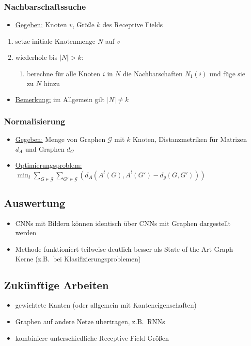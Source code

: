 \subsubsection{Nachbarschaftssuche}

\begin{itemize}
  \item \underline{Gegeben:} Knoten $v$, Größe $k$ des Receptive Fields
\end{itemize}

\begin{enumerate}
  \item setze initiale Knotenmenge $N$ auf $v$
  \item wiederhole bis $|N| > k$:
    \begin{enumerate}
      \item berechne für alle Knoten $i$ in $N$ die Nachbarschaften $N_1(i)$ und füge sie zu $N$ hinzu
    \end{enumerate}
\end{enumerate}

\begin{itemize}
  \item \underline{Bemerkung:} im Allgemein gilt $|N| \neq k$
\end{itemize}

\subsubsection{Normalisierung}

\begin{itemize}
  \item \underline{Gegeben:} Menge von Graphen $\mathcal{G}$ mit $k$ Knoten, Distanzmetriken für Matrizen $d_A$ und Graphen $d_G$
  \item \underline{Optimierungsproblem:} $\min_l \sum_{G \in \mathcal{G}} \sum_{G' \in \mathcal{G}} {( d_A(A^l(G), A^l(G') - d_g(G, G')) )}$

\end{itemize}

\subsection{Auswertung}

\begin{itemize}
  \item CNNs mit Bildern können identisch über CNNs mit Graphen dargestellt werden
  \item Methode funktioniert teilweise deutlich besser als State-of-the-Art Graph-Kerne (z.B.\ bei Klasifizierungsproblemen)
\end{itemize}

\subsection{Zukünftige Arbeiten}

\begin{itemize}
  \item gewichtete Kanten (oder allgemein mit Kanteneigenschaften)
  \item Graphen auf andere Netze übertragen, z.B.\ RNNs
  \item kombiniere unterschiedliche Receptive Field Größen
\end{itemize}
